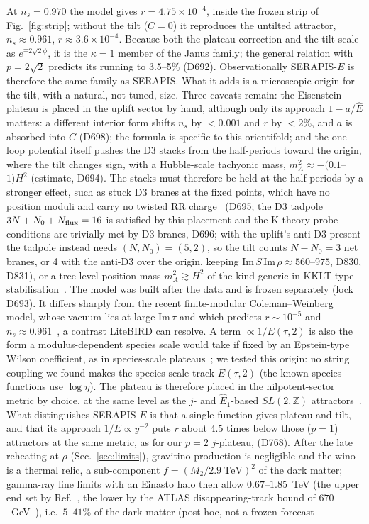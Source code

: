 \documentclass[aps,prd,twocolumn,superscriptaddress,nofootinbib,floatfix]{revtex4-2}
\begin{document}
At $n_s=0.970$ the model gives $r=4.75\times10^{-4}$, inside the frozen strip of Fig.~\ref{fig:strip}; without the tilt ($C=0$) it reproduces the untilted attractor, $n_s\approx0.961$, $r\approx3.6\times10^{-4}$. Because both the plateau correction and the tilt scale as $e^{\mp2\sqrt2\phi}$, it is the $\kappa=1$ member of the Janus family; the general relation with $p=2\sqrt2$ predicts its running to 3.5--5\% (D692). Observationally SERAPIS-$E$ is therefore the same family as SERAPIS. What it adds is a microscopic origin for the tilt, with a natural, not tuned, size. Three caveats remain: the Eisenstein plateau is placed in the uplift sector by hand, although only its approach $1-a/\hat E$ matters: a different interior form shifts $n_s$ by $<0.001$ and $r$ by $<2\%$, and $a$ is absorbed into $C$ (D698); the formula is specific to this orientifold; and the one-loop potential itself pushes the D3 stacks from the half-periods toward the origin, where the tilt changes sign, with a Hubble-scale tachyonic mass, $m_A^2\approx-(0.1$--$1)H^2$ (estimate, D694). The stacks must therefore be held at the half-periods by a stronger effect, such as stuck D3 branes at the fixed points, which have no position moduli and carry no twisted RR charge~\cite{MaidenShiuStefanski2006} (D695; the D3 tadpole $3N+N_0+N_{\rm flux}=16$ is satisfied by this placement and the K-theory probe conditions are trivially met by D3 branes, D696; with the uplift's anti-D3 present the tadpole instead needs $(N,N_0)=(5,2)$, so the tilt counts $N-N_0=3$ net branes, or 4 with the anti-D3 over the origin, keeping $\mathrm{Im}\,S\,\mathrm{Im}\,\rho\approx560$--$975$, D830, D831), or a tree-level position mass $m_A^2\gtrsim H^2$ of the kind generic in KKLT-type stabilisation~\cite{BHK2004}. The model was built after the data and is frozen separately (lock D693). It differs sharply from the recent finite-modular Coleman--Weinberg model, whose vacuum lies at large $\mathrm{Im}\,\tau$ and which predicts $r\sim10^{-5}$ and $n_s\approx0.961$~\cite{arXiv_2607_00528}, a contrast LiteBIRD can resolve. A term $\propto1/E(\tau,2)$ is also the form a modulus-dependent species scale would take if fixed by an Epstein-type Wilson coefficient, as in species-scale plateaus~\cite{arXiv_2407_12081,arXiv_2510_23715}; we tested this origin: no string coupling we found makes the species scale track $E(\tau,2)$ (the known species functions use $\log\eta$). The plateau is therefore placed in the nilpotent-sector metric by choice, at the same level as the $j$- and $\hat E_1$-based $SL(2,\mathbb{Z})$ attractors~\cite{arXiv_2408_05203}. What distinguishes SERAPIS-$E$ is that a single function gives plateau and tilt, and that its approach $1/E\propto y^{-2}$ puts $r$ about $4.5$ times below those ($p=1$) attractors at the same metric, as for our $p=2$ $j$-plateau, (D768). After the late reheating at $\rho$ (Sec.~\ref{sec:limits}), gravitino production is negligible and the wino is a thermal relic, a sub-component $f=(M_2/2.9~\mathrm{TeV})^2$ of the dark matter; gamma-ray line limits with an Einasto halo then allow $0.67$--$1.85$~TeV (the upper end set by Ref.~\cite{arXiv_2507_15934}, the lower by the ATLAS disappearing-track bound of $670$~GeV~\cite{arXiv_2603_08315}), i.e.\ $5$--$41\%$ of the dark matter (post hoc, not a frozen forecast 
\end{document}
